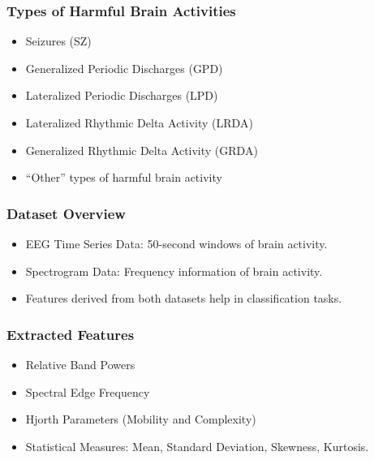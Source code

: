 \documentclass[leqno]{beamer}
\begin{document}
\begin{frame}
\frametitle{Types of Harmful Brain Activities}
\begin{itemize}
\item Seizures (SZ)
\bigskip
\item Generalized Periodic Discharges (GPD)
\bigskip
\item Lateralized Periodic Discharges (LPD)
\bigskip
\item Lateralized Rhythmic Delta Activity (LRDA)
\bigskip
\item Generalized Rhythmic Delta Activity (GRDA)
\bigskip
\item ``Other'' types of harmful brain activity
\end{itemize}
\end{frame}


\begin{frame}
\frametitle{Dataset Overview}
\begin{itemize}
\item EEG Time Series Data: 50-second windows of brain activity.
\bigskip
\item Spectrogram Data: Frequency information of brain activity.
\bigskip
\item Features derived from both datasets help in classification tasks.
\end{itemize}
\end{frame}


\begin{frame}
\frametitle{Extracted Features}
\begin{itemize}
\item Relative Band Powers
\bigskip
\item Spectral Edge Frequency
\bigskip
\item Hjorth Parameters (Mobility and Complexity)
\bigskip
\item Statistical Measures: Mean, Standard Deviation, Skewness, Kurtosis.
\end{itemize}
\end{frame}
\end{document}
